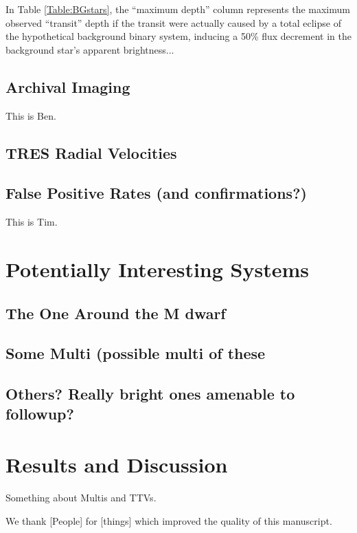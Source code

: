 \documentclass{emulateapj}
\begin{document}
In Table \ref{Table:BGstars}, the ``maximum depth'' column represents
the maximum observed ``transit'' depth if the transit were actually caused
by a total eclipse of the hypothetical background binary system, inducing
a 50\% flux decrement in the background star's apparent brightness...

\subsection{Archival Imaging}

This is Ben.


\subsection{TRES Radial Velocities}

\subsection{False Positive Rates (and confirmations?)}
This is Tim.

\section{Potentially Interesting Systems}
\subsection{The One Around the M dwarf}



\subsection{Some Multi (possible multi of these}

\subsection{Others? Really bright ones amenable to followup?}

\section{Results and Discussion}

Something about Multis and TTVs. 




\acknowledgements
We thank [People] for [things] which improved the quality of this manuscript.
\end{document}
